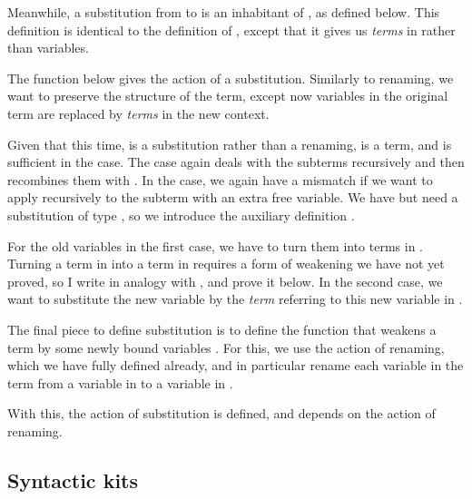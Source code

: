 Meanwhile, a substitution from \AgdaBound{$\Gamma$} to \AgdaBound{$\Delta$} is
an inhabitant of \AgdaSpace{}\AgdaBound{$\Gamma$}\AgdaSpace{}%
\AgdaBound{$\Delta$}, as defined below.
This definition is identical to the definition of , except
that it gives us \emph{terms} in \AgdaBound{$\Gamma$} rather than variables.

\Sub{}

The  function below gives the action of a substitution.
Similarly to renaming, we want to preserve the structure of the term, except
now variables in the original term are replaced by \emph{terms} in the new
context.

\substitute{}

Given that this time, \AgdaBound{$\rho$} is a substitution rather than a
renaming, \AgdaBound{$\rho$}  is a term, and is sufficient in the
 case.
The  case again deals with the subterms
recursively and then recombines them with .
In the  case, we again have a mismatch if we
want to apply  recursively to the subterm  with
an extra free variable.
We have \AgdaBound{$\rho$} \AgdaSymbol{:} \SubGD{} but need a substitution of
type \SubGADA{}, so we introduce the auxiliary definition
.

\bindSub{}

For the old variables in the first case, we have \AgdaBound{$\rho$} to turn
them into terms in \AgdaBound{$\Gamma$}.
Turning a term in \AgdaBound{$\Gamma$} into a term in \GTh{} requires a form
of weakening we have not yet proved, so I write  in analogy
with , and prove it below.
In the second case, we want to substitute the new variable by the \emph{term}
referring to this new variable in \GTh{}.

The final piece to define substitution is to define the function that weakens
a term by some newly bound variables \AgdaBound{$\Delta$}.
For this, we use the action of renaming, which we have fully defined already,
and in particular rename each variable in the term from a variable in
\AgdaBound{$\Gamma$} to a variable in \GD{}.

\leftTerm{}

With this, the action of substitution is defined, and depends on the action
of renaming.

\subsection{Syntactic kits}\label{sec:syntactic-kits}

